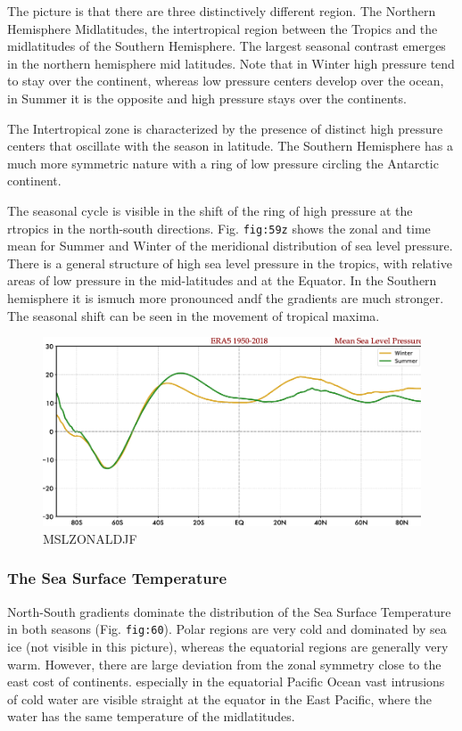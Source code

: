 The picture is that there are three distinctively different region. The
Northern Hemisphere Midlatitudes, the intertropical region between the
Tropics and the midlatitudes of the Southern Hemisphere. The largest
seasonal contrast emerges in the northern hemisphere mid latitudes. Note
that in Winter high pressure tend to stay over the continent, whereas
low pressure centers develop over the ocean, in Summer it is the
opposite and high pressure stays over the continents.

The Intertropical zone is characterized by the presence of distinct high
pressure centers that oscillate with the season in latitude. The
Southern Hemisphere has a much more symmetric nature with a ring of low
pressure circling the Antarctic continent.

The seasonal cycle is visible in the shift of the ring of high pressure
at the rtropics in the north-south directions. Fig. \texttt{fig:59z}
shows the zonal and time mean for Summer and Winter of the meridional
distribution of sea level pressure. There is a general structure of high
sea level pressure in the tropics, with relative areas of low pressure
in the mid-latitudes and at the Equator. In the Southern hemisphere it
is ismuch more pronounced andf the gradients are much stronger. The
seasonal shift can be seen in the movement of tropical maxima.
\begin{figure}[h!]
    \centering
    \includegraphics[width=0.5\linewidth]{uploads/Screenshot 2024-11-19 133117.png}
    \caption{MSLZONALDJF}
    \label{fig:enter-label}
\end{figure}


\subsubsection{The Sea Surface
Temperature}\label{the-sea-surface-temperature}

North-South gradients dominate the distribution of the Sea Surface
Temperature in both seasons (Fig. \texttt{fig:60}). Polar regions are
very cold and dominated by sea ice (not visible in this picture),
whereas the equatorial regions are generally very warm. However, there
are large deviation from the zonal symmetry close to the east cost of
continents. especially in the equatorial Pacific Ocean vast intrusions
of cold water are visible straight at the equator in the East Pacific,
where the water has the same temperature of the midlatitudes.

